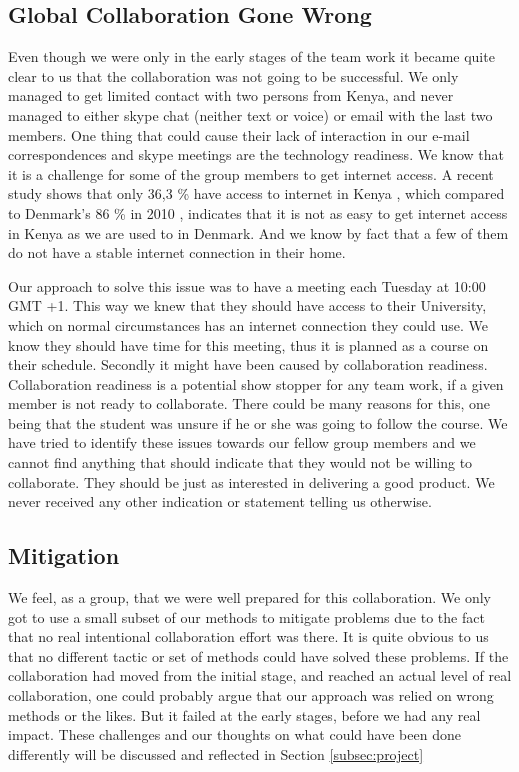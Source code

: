 \subsection{Global Collaboration Gone Wrong} \label{sec:teamworkgonewrong}
Even though we were only in the early stages of the team work it became quite clear to us that the collaboration was not going to be successful. We only managed to get limited contact with two persons from Kenya, and never managed to either skype chat (neither text or voice) or email with the last two members. One thing that could cause their lack of interaction in our e-mail correspondences and skype meetings are the technology readiness. We know that it is a challenge for some of the group members to get internet access. A recent study shows that only 36,3 \% have access to internet in Kenya \cite{capitalfm2012internet}, which compared to Denmark's 86 \% in 2010 \cite{folketingets-eu-oplysning}, indicates that it is not as easy to get internet access in Kenya as we are used to in Denmark. And we know by fact that a few of them do not have a stable internet connection in their home. 

Our approach to solve this issue was to have a meeting each Tuesday at 10:00 GMT +1. This way we knew that they should have access to their University, which on normal circumstances has an internet connection they could use. We know they should have time for this meeting, thus it is planned as a course on their schedule. Secondly it might have been caused by collaboration readiness. Collaboration readiness is a potential show stopper for any team work, if a given member is not ready to collaborate. There could be many reasons for this, one being that the student was unsure if he or she was going to follow the course. We have tried to identify these issues towards our fellow group members and we cannot find anything that should indicate that they would not be willing to collaborate. They should be just as interested in delivering a good product. We never received any other indication or statement telling us otherwise.

\subsection{Mitigation} \label{sec:mitigation}
We feel, as a group, that we were well prepared for this collaboration. We only got to use a small subset of our methods to mitigate problems due to the fact that no real intentional collaboration effort was there. It is quite obvious to us that no different tactic or set of methods could have solved these problems. If the collaboration had moved from the initial stage, and reached an actual level of real collaboration, one could probably argue that our approach was relied on wrong methods or the likes. But it failed at the early stages, before we had any real impact. These challenges and our thoughts on what could have been done differently will be discussed and reflected in Section \ref{subsec:project}